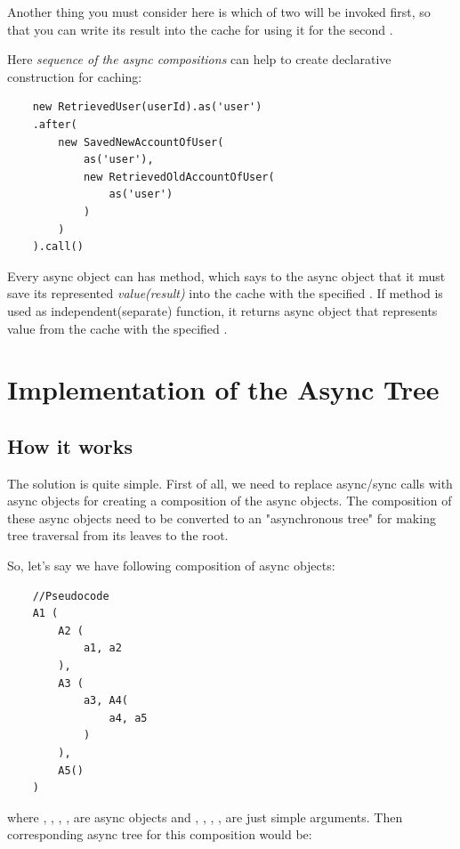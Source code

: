\documentclass{article}
\begin{document}
Another thing you must consider here is which of two  will be invoked first, so that you can write its result into the cache for using it for the second .

Here \textit{sequence of the async compositions} can help to create declarative construction for caching:

\begin{verbatim}
    new RetrievedUser(userId).as('user')
    .after(
        new SavedNewAccountOfUser(
            as('user'),
            new RetrievedOldAccountOfUser(
                as('user')
            )
        )
    ).call()
\end{verbatim}

Every async object can has  method, which says to the async object that it must save its represented \textit{value(result)} into the cache with the specified . If  method is used as independent(separate) function, it returns async object that represents value from the cache with the specified .

\section{Implementation of the Async Tree}

\subsection{How it works}

The solution is quite simple. First of all, we need to replace async/sync calls with async objects for creating a composition of the async objects. The composition of these async objects need to be converted to an "asynchronous tree" for making tree traversal from its leaves to the root.

So, let's say we have following composition of async objects:

\begin{verbatim}
    //Pseudocode
    A1 (
        A2 (
            a1, a2
        ),
        A3 (
            a3, A4(
                a4, a5
            )
        ),
        A5()
    )
\end{verbatim}
where , , , ,  are async objects and , , , ,  are just simple arguments. Then corresponding async tree for this composition would be:
\end{document}
